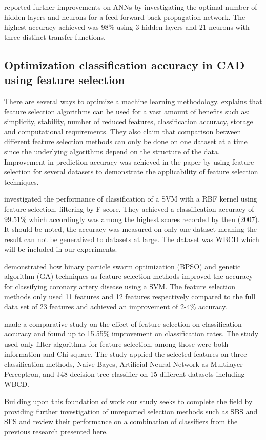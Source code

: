 \textcite{Abdel-Ilah2017} reported further improvements on ANNs by investigating the optimal number of hidden layers and neurons for a feed forward back propagation network. The highest accuracy achieved was 98\% using 3 hidden layers and 21 neurons with three distinct transfer functions.

\subsection{Optimization classification accuracy in CAD using feature selection}


There are several ways to optimize a machine learning methodology. \textcite{c201416} explains that feature selection algorithms can be used for a vast amount of benefits such as: simplicity, stability, number of reduced features, classification accuracy, storage and computational requirements. They also claim that comparison between different feature selection methods can only be done on one dataset at a time since the underlying algorithms depend on the structure of the data. Improvement in prediction accuracy was achieved in the paper by using feature selection for several datasets to demonstrate the applicability of feature selection techniques.

\textcite{akay2009} investigated the performance of classification of a SVM with a RBF kernel using feature selection, filtering by F-score. They achieved a classification accuracy of 99.51\% which accordingly was among the highest scores recorded by then (2007). It should be noted, the accuracy was measured on only one dataset meaning the result can not be generalized to datasets at large. The dataset was WBCD which will be included in our experiments.

\textcite{b20103177} demonstrated how  binary particle swarm optimization (BPSO) and genetic algorithm (GA) techniques as feature selection methods improved the accuracy for classifying coronary artery disease using a SVM. The feature selection methods only used 11 features and 12 features respectively compared to the full data set of 23 features and achieved an improvement of 2-4\% accuracy.

\textcite{karabulut2012} made a comparative study on the effect of feature selection on classification accuracy and found up to 15.55\% improvement on classification rates. The study used only filter algorithms for feature selection, among those were both information and Chi-square. The study applied the selected features on three classification methods, Naive Bayes, Artificial Neural Network as Multilayer Perceptron, and J48 decision tree classifier on 15 different datasets including WBCD.

Building upon this foundation of work our study seeks to complete the field by providing further investigation of unreported selection methods such as SBS and SFS and review their performance on a combination of classifiers from the previous research presented here.
